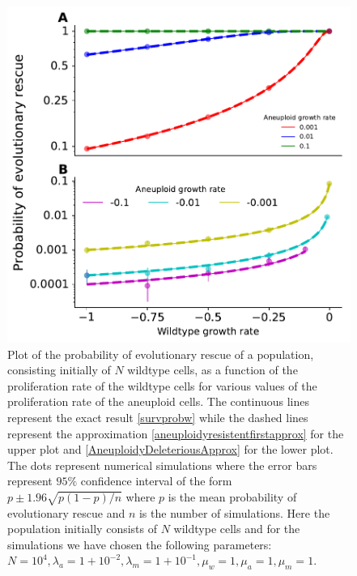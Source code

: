 \documentclass[12pt]{extarticle}
\begin{document}
\begin{figure}[!h]
 \vspace*{1\baselineskip}
\includegraphics[width=1\textwidth]{Figures/CombinedSubplot.pdf}
\caption{Plot of the probability of evolutionary rescue of a population, consisting initially of $N$ wildtype cells, as a function of the proliferation rate of the wildtype cells for various values of the proliferation rate of the aneuploid cells. The continuous lines represent the exact result \eqref{survprobw} while the dashed lines represent the approximation \eqref{aneuploidyresistentfirstapprox} for the upper plot and \eqref{AneuploidyDeleteriousApprox} for the lower plot. The dots represent numerical simulations where the error bars represent $95\%$ confidence interval of the form $p\pm1.96\sqrt{p\left(1-p\right)/n}$ where $p$ is the mean probability of evolutionary rescue and $n$ is the number of simulations. Here the population initially consists of $N$ wildtype cells and for the simulations we have chosen the following parameters: $N=10^4, \lambda_a=1+10^{-2},\lambda_m=1+10^{-1},\mu_w=1,\mu_a=1,\mu_m=1$. }
\label{SurvPlot}
\end{figure}
\end{document}
